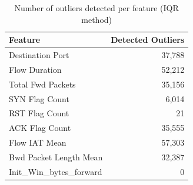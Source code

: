 \documentclass[12pt,a4paper]{article}
\begin{document}
\begin{table}[H]
\centering
\caption{Number of outliers detected per feature (IQR method)}
\label{tab:outliers}
\begin{tabular}{lr}
\toprule
\textbf{Feature} & \textbf{Detected Outliers} \\
\midrule
Destination Port & 37,788 \\
Flow Duration & 52,212 \\
Total Fwd Packets & 35,156 \\
SYN Flag Count & 6,014 \\
RST Flag Count & 21 \\
ACK Flag Count & 35,555 \\
Flow IAT Mean & 57,303 \\
Bwd Packet Length Mean & 32,387 \\
Init\_Win\_bytes\_forward & 0 \\
\bottomrule
\end{tabular}
\end{table}
\end{document}
